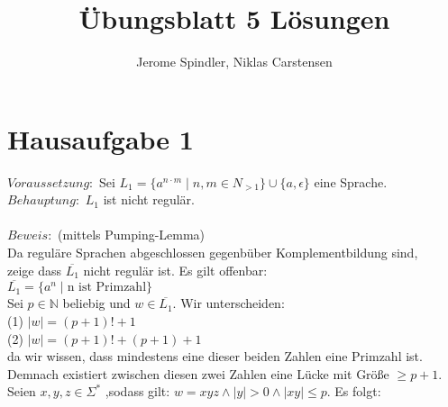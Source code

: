 \documentclass{article}
\title{Übungsblatt 5 Lösungen}
\author{Jerome Spindler, Niklas Carstensen}
\begin{document}
\maketitle

\section{Hausaufgabe 1}

$Voraussetzung:$ Sei $L_1 = \{a^{n \cdot m} \mid n,m \in N_{>1} \} \cup \{a, \epsilon\}$ eine Sprache.\\
$Behauptung:$ $L_1$ ist nicht regulär.\\
\\
$Beweis:$ (mittels Pumping-Lemma)\\
Da reguläre Sprachen abgeschlossen gegenbüber Komplementbildung sind,\\
zeige dass $\overline{L_1}$ nicht regulär ist. Es gilt offenbar:\\
$\overline{L_1} = \{a^n \mid \textrm{n ist Primzahl}\}$\\
Sei $p \in \mathbb{N}$ beliebig und $w \in \overline{L_1}$. Wir unterscheiden:\\
(1) $|w| = (p+1)! + 1$\\
(2) $|w| = (p+1)! + (p+ 1) + 1$\\
da wir wissen, dass mindestens eine dieser beiden Zahlen eine Primzahl ist.\\
Demnach existiert zwischen diesen zwei Zahlen eine Lücke mit Größe $\geq p + 1$.\\
Seien $x,y,z \in \Sigma^*$ ,sodass gilt: $w = xyz \land |y| > 0 \land |xy| \leq p$. Es folgt:\\
\end{document}
